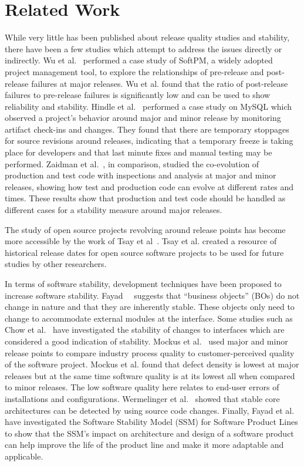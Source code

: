 \documentclass[conference]{IEEEtran}
\begin{document}
\section{Related Work}
\label{sec:rel}
While very little has been published about release quality studies and stability, there have been a few studies which attempt to address the issues directly
or indirectly. Wu et al.~\cite{Wu:2008:QAF} performed a case study of SoftPM, a widely adopted project management tool, to explore the relationships of
pre-release and post-release failures at major releases. Wu et al. found that the ratio of post-release failures to pre-release failures is significantly low
and can be used to show reliability and stability. Hindle et al.~\cite{Hindle:2007:RPD} performed a case study on MySQL which observed a project's behavior
around major and minor release by monitoring artifact check-ins and changes. They found that there are temporary stoppages for source revisions around releases,
indicating that a temporary freeze is taking place for developers and that last minute fixes and manual testing may be performed.
Zaidman et al.~\cite{Zaidman:2011:SCP}, in comparison, studied the co-evolution of production and test code with inspections and analysis
at major and minor releases, showing how test and production code can evolve at different rates and times. These results show that production
and test code should be handled as different cases for a stability measure around major releases. 

The study of open source projects revolving around release points has become more accessible by the work of Tsay et al~\cite{Tsay:2011:EMO}. Tsay et al. created
a resource of historical release dates for open source software projects to be used for future studies by other researchers.

In terms of software stability, development techniques have been proposed to increase software stability. 
Fayad~\cite{Fayad:2001:TOI}~\cite{Fayad:2002:ASS} suggests that ``business objects'' (BOs) do not change in nature and that they are inherently stable. These
objects only need to change to accommodate external modules at the interface. Some studies such as Chow et al.~\cite{Chow:2011:SJI} have investigated
the stability of changes to interfaces which are considered a good indication of stability.
Mockus et al.~\cite{Mockus:2008:IQR} used major and minor release points to compare industry process quality to customer-perceived quality of the software
project. Mockus et al. found that defect density is lowest at major releases but at the same time software quality is at its lowest all when compared to minor
releases. The low software quality here relates to end-user errors of installations and configurations. Wermelinger et al.~\cite{Wermelinger:2008:AEE}
showed that stable core architectures can be detected by using source code changes. Finally, Fayad et al.~\cite{Fayad:2010:SSM} have
investigated the Software Stability Model (SSM) for Software Product Lines to show that the SSM's impact on architecture and design of a software product
can help improve the life of the product line and make it more adaptable and applicable.
\end{document}
